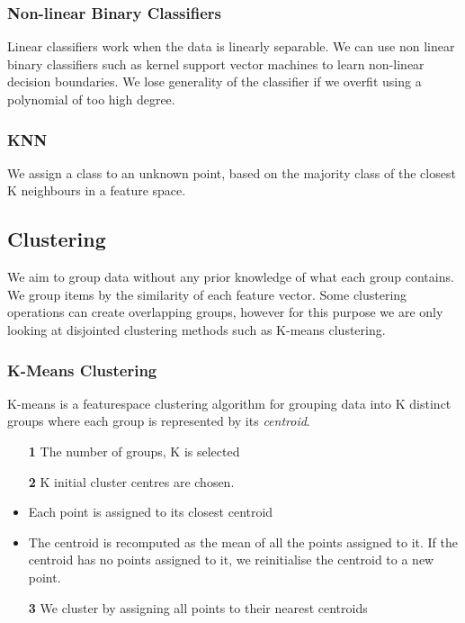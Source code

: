\subsubsection{Non-linear Binary Classifiers}
Linear classifiers work when the data is linearly separable. We can use non linear binary classifiers such as kernel support vector machines to learn non-linear decision boundaries. We lose generality of the classifier if we overfit using a polynomial of too high degree.

\subsubsection{KNN}
We assign a class to an unknown point, based on the majority class of the closest K neighbours in a feature space.

\subsection{Clustering}
We aim to group data without any prior knowledge of what each group contains. We group items by the similarity of each feature vector. Some clustering operations can create overlapping groups, however for this purpose we are only looking at disjointed clustering methods such as K-means clustering.

\subsubsection{K-Means Clustering}
K-means is a featurespace clustering algorithm for grouping data into K distinct groups where each group is represented by its \textit{centroid}.

\begin{itemize}
    \item [\textbf{1}] The number of groups, K is selected
    \item [\textbf{2}] K initial cluster centres are chosen.
    \item Each point is assigned to its closest centroid
    \item The centroid is recomputed as the mean of all the points assigned to it. If the centroid has no points assigned to it, we reinitialise the centroid to a new point.
    \item [\textbf{3}] We cluster by assigning all points to their nearest centroids
\end{itemize}

